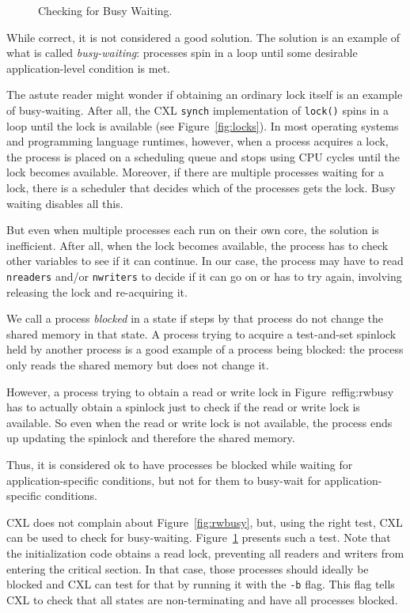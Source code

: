\documentclass{report}
\newenvironment{code}{
\tcolorbox
}{
\endtcolorbox
}
\begin{document}
\begin{figure}
\begin{code}
\end{code}
\caption{Checking for Busy Waiting.}
\label{fig:rwblock}
\end{figure}

While correct, it is not considered a good solution.
The solution is an example of what is called \emph{busy-waiting}:
processes spin in a loop until some desirable application-level condition is met.

The astute reader might wonder if obtaining an ordinary lock itself is an
example of busy-waiting.  After all, the CXL \texttt{synch} implementation
of \texttt{lock()} spins in a loop until the lock is available
(see Figure~\ref{fig:locks}).
In most operating systems and programming language runtimes, however,
when a process acquires a lock, the process is placed on a scheduling
queue and stops using CPU cycles until the lock becomes available.
Moreover, if there are multiple processes waiting for a lock, there
is a scheduler that decides which of the processes gets the lock.
Busy waiting disables all this.

But even when multiple processes each run on their own core, the solution
is inefficient.  After all, when the lock becomes available, the process
has to check other variables to see if it can continue.  In our case,
the process may have to read \texttt{nreaders} and/or \texttt{nwriters}
to decide if it can go on or has to try again, involving releasing
the lock and re-acquiring it.

We call a process \emph{blocked} in a state if steps by that process
do not change the shared memory in that state.  A process trying to
acquire a test-and-set spinlock held by another process is a good example
of a process being blocked: the process only reads the shared memory
but does not change it.

However, a process trying to obtain a read or write lock in
Figure~ref{fig:rwbusy} has to actually obtain a spinlock just to check
if the read or write lock is available.  So even when the read or write
lock is not available, the process ends up updating the spinlock and
therefore the shared memory.

Thus, it is considered ok to have processes be blocked while waiting
for application-specific conditions, but not for them to
busy-wait for application-specific conditions.

CXL does not complain about Figure~\ref{fig:rwbusy}, but, using
the right test, CXL can be used to check for busy-waiting.
Figure~\ref{fig:rwblock} presents such a test.
Note that the initialization code obtains a read lock, preventing
all readers and writers from entering the critical section.
In that case, those processes should ideally be blocked and CXL
can test for that by running it with the \texttt{-b} flag.
This flag tells CXL to check
that all states are non-terminating and have all processes blocked.
\end{document}
